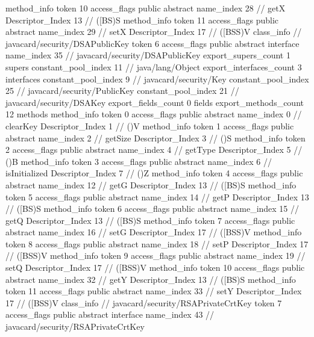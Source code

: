 {{{{{				}
				method_info {
					token	10
					access_flags	public abstract
					name_index	28		// getX
					Descriptor_Index	13		// ([BS)S
				}
				method_info {
					token	11
					access_flags	public abstract
					name_index	29		// setX
					Descriptor_Index	17		// ([BSS)V
				}
			}
		}
		class_info {		// javacard/security/DSAPublicKey
			token	6
			access_flags	public abstract interface
			name_index	35		// javacard/security/DSAPublicKey
			export_supers_count	1
			supers {
				constant_pool_index	11		// java/lang/Object
			}
			export_interfaces_count	3
			interfaces {
				constant_pool_index	9		// javacard/security/Key
				constant_pool_index	25		// javacard/security/PublicKey
				constant_pool_index	21		// javacard/security/DSAKey
			}
			export_fields_count	0
			fields {
			}
			export_methods_count	12
			methods {
				method_info {
					token	0
					access_flags	public abstract
					name_index	0		// clearKey
					Descriptor_Index	1		// ()V
				}
				method_info {
					token	1
					access_flags	public abstract
					name_index	2		// getSize
					Descriptor_Index	3		// ()S
				}
				method_info {
					token	2
					access_flags	public abstract
					name_index	4		// getType
					Descriptor_Index	5		// ()B
				}
				method_info {
					token	3
					access_flags	public abstract
					name_index	6		// isInitialized
					Descriptor_Index	7		// ()Z
				}
				method_info {
					token	4
					access_flags	public abstract
					name_index	12		// getG
					Descriptor_Index	13		// ([BS)S
				}
				method_info {
					token	5
					access_flags	public abstract
					name_index	14		// getP
					Descriptor_Index	13		// ([BS)S
				}
				method_info {
					token	6
					access_flags	public abstract
					name_index	15		// getQ
					Descriptor_Index	13		// ([BS)S
				}
				method_info {
					token	7
					access_flags	public abstract
					name_index	16		// setG
					Descriptor_Index	17		// ([BSS)V
				}
				method_info {
					token	8
					access_flags	public abstract
					name_index	18		// setP
					Descriptor_Index	17		// ([BSS)V
				}
				method_info {
					token	9
					access_flags	public abstract
					name_index	19		// setQ
					Descriptor_Index	17		// ([BSS)V
				}
				method_info {
					token	10
					access_flags	public abstract
					name_index	32		// getY
					Descriptor_Index	13		// ([BS)S
				}
				method_info {
					token	11
					access_flags	public abstract
					name_index	33		// setY
					Descriptor_Index	17		// ([BSS)V
				}
			}
		}
		class_info {		// javacard/security/RSAPrivateCrtKey
			token	7
			access_flags	public abstract interface
			name_index	43		// javacard/security/RSAPrivateCrtKey
}}}
